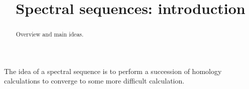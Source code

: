 \documentclass{ximera}
\title{Spectral sequences: introduction}
\begin{document}
\begin{abstract}
Overview and main ideas.
\end{abstract}
\maketitle

The idea of a spectral sequence is to perform a succession of homology
calculations to converge to some more difficult calculation.
\end{document}
